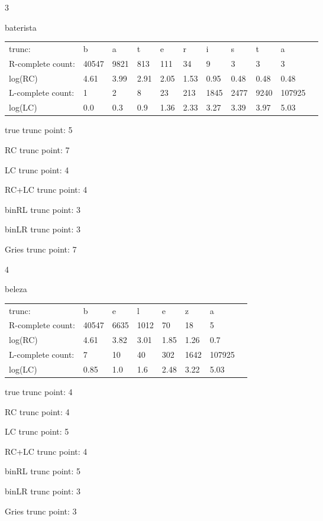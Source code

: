 \documentclass[10pt]{article}
\begin{document}
\vspace{1em}

3

baterista

\begin{tabular}{l|llllllllll}
trunc: & b & a & t & e & r & i & s & t & a & \\ 
R-complete count: & 40547 & 9821 & 813 & 111 & 34 & 9 & 3 & 3 & 3 & \\ 
log(RC) & 4.61 & 3.99 & 2.91 & 2.05 & 1.53 & 0.95 & 0.48 & 0.48 & 0.48 & \\ 
L-complete count: & 1 & 2 & 8 & 23 & 213 & 1845 & 2477 & 9240 & 107925 & \\ 
log(LC) & 0.0 & 0.3 & 0.9 & 1.36 & 2.33 & 3.27 & 3.39 & 3.97 & 5.03 & \\ 
\end{tabular}

true trunc point: 5

RC trunc point: 7

LC trunc point: 4

RC+LC trunc point: 4

binRL trunc point: 3

binLR trunc point: 3

Gries trunc point: 7

\vspace{1em}

4

beleza

\begin{tabular}{l|lllllll}
trunc: & b & e & l & e & z & a & \\ 
R-complete count: & 40547 & 6635 & 1012 & 70 & 18 & 5 & \\ 
log(RC) & 4.61 & 3.82 & 3.01 & 1.85 & 1.26 & 0.7 & \\ 
L-complete count: & 7 & 10 & 40 & 302 & 1642 & 107925 & \\ 
log(LC) & 0.85 & 1.0 & 1.6 & 2.48 & 3.22 & 5.03 & \\ 
\end{tabular}

true trunc point: 4

RC trunc point: 4

LC trunc point: 5

RC+LC trunc point: 4

binRL trunc point: 5

binLR trunc point: 3

Gries trunc point: 3

\newpage
\end{document}
